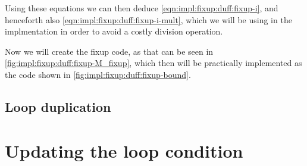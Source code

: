 Using these equations we can then deduce \cref{eqn:impl:fixup:duff:fixup-i}, and henceforth also \cref{eqn:impl:fixup:duff:fixup-i-mult}, which we will be using in the implmentation in order to avoid a costly division operation.

Now we will create the fixup code, as that can be seen in \cref{fig:impl:fixup:duff:fixup-M_fixup}, which then will be practically implemented as the code shown in \cref{fig:impl:fixup:duff:fixup-bound}.





\subsection{Loop duplication}\label{sec:impl:fixup:loop}

\section{Updating the loop condition}\label{sec:impl:fixup:header-cond}

